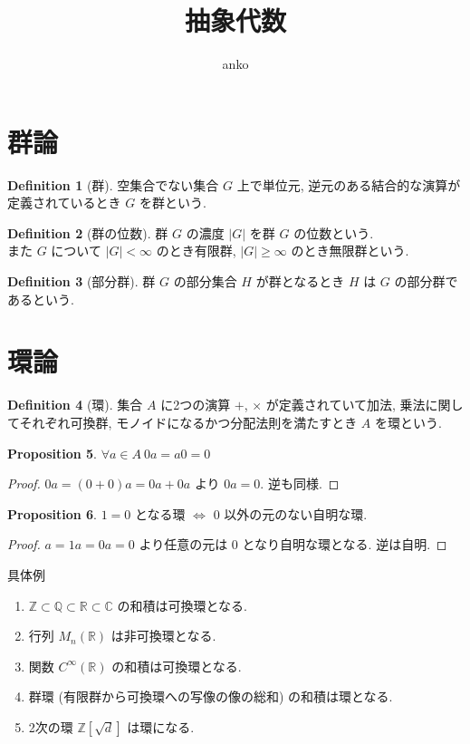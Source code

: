 \documentclass[a4paper,dvipdfmx]{jsarticle}
\theoremstyle{plain}
\theoremstyle{definition}
\theoremstyle{plain}
\numberwithin{equation}{section}
\numberwithin{theorem}{section}
\numberwithin{definition}{section}
\numberwithin{note}{section}
\theoremstyle{definition}
\newtheorem{dfn}{Definition}[section]
\newtheorem{prop}[dfn]{Proposition}
\begin{document}
\title{抽象代数}
\author{
  anko
}
\maketitle
\tableofcontents
\clearpage

\section{群論}
\begin{dfn}[群]
  空集合でない集合 $G$ 上で単位元, 逆元のある結合的な演算が定義されているとき $G$ を群という.
\end{dfn}

\begin{dfn}[群の位数]
  群 $G$ の濃度 $|G|$ を群 $G$ の位数という. \\
  また $G$ について $|G| < \infty$ のとき有限群, $|G| \geq \infty$ のとき無限群という.
\end{dfn}

\begin{dfn}[部分群]
  群 $G$ の部分集合 $H$ が群となるとき $H$ は $G$ の部分群であるという.
\end{dfn}

\section{環論}
\begin{dfn}[環]
  集合 $A$ に2つの演算 $+$, $\times$ が定義されていて加法, 乗法に関してそれぞれ可換群, モノイドになるかつ分配法則を満たすとき $A$ を環という.
\end{dfn}

\begin{prop}
  $\forall a\in A\ 0a = a0 = 0$
\end{prop}
\begin{proof}
  $0a = (0 + 0)a = 0a + 0a$ より $0a = 0$. 逆も同様.
\end{proof}

\begin{prop}
  $1=0$ となる環 $\iff$ $0$ 以外の元のない自明な環.
\end{prop}
\begin{proof}
  $a = 1a = 0a = 0$ より任意の元は $0$ となり自明な環となる. 逆は自明.
\end{proof}

具体例
\begin{enumerate}
  \item $\mathbb{Z}\subset\mathbb{Q}\subset\mathbb{R}\subset\mathbb{C}$ の和積は可換環となる.
  \item 行列 $M_n(\mathbb{R})$ は非可換環となる.
  \item 関数 $C^\infty(\mathbb{R})$ の和積は可換環となる.
  \item 群環 (有限群から可換環への写像の像の総和) の和積は環となる.
  \item 2次の環 $\mathbb{Z}[\sqrt{d}]$ は環になる.
\end{enumerate}
\end{document}
